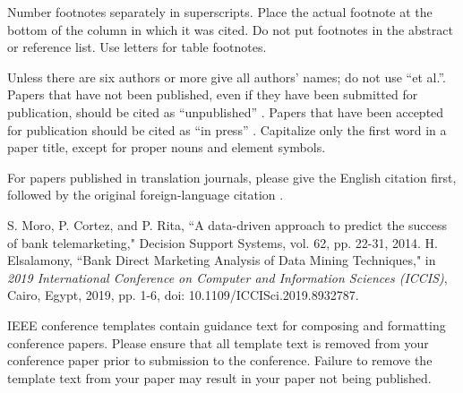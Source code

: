 \documentclass[conference]{IEEEtran}
\begin{document}
Number footnotes separately in superscripts. Place the actual footnote at 
the bottom of the column in which it was cited. Do not put footnotes in the 
abstract or reference list. Use letters for table footnotes.

Unless there are six authors or more give all authors' names; do not use 
``et al.''. Papers that have not been published, even if they have been 
submitted for publication, should be cited as ``unpublished'' \cite{b4}. Papers 
that have been accepted for publication should be cited as ``in press'' \cite{b5}. 
Capitalize only the first word in a paper title, except for proper nouns and 
element symbols.

For papers published in translation journals, please give the English 
citation first, followed by the original foreign-language citation \cite{b6}.

\begin{thebibliography}{00}
S. Moro, P. Cortez, and P. Rita, ``A data-driven approach to predict the success of bank telemarketing," Decision Support Systems, vol. 62, pp. 22-31, 2014.
H. Elsalamony, ``Bank Direct Marketing Analysis of Data Mining Techniques," in \emph{2019 International Conference on Computer and Information Sciences (ICCIS)}, Cairo, Egypt, 2019, pp. 1-6, doi: 10.1109/ICCISci.2019.8932787.
\end{thebibliography}
\vspace{12pt}
\color{red}
IEEE conference templates contain guidance text for composing and formatting conference papers. Please ensure that all template text is removed from your conference paper prior to submission to the conference. Failure to remove the template text from your paper may result in your paper not being published.
\end{document}

